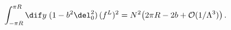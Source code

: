 \begin{equation}
\int_{-\pi R}^{\pi R} \dif y \; (1-b^2 \del_0^2) \, (f^L)^2 = N^2
\big(2\pi R -2 b + \mathcal{O}(1/\Lambda^3) \big) \, .
\end{equation}

